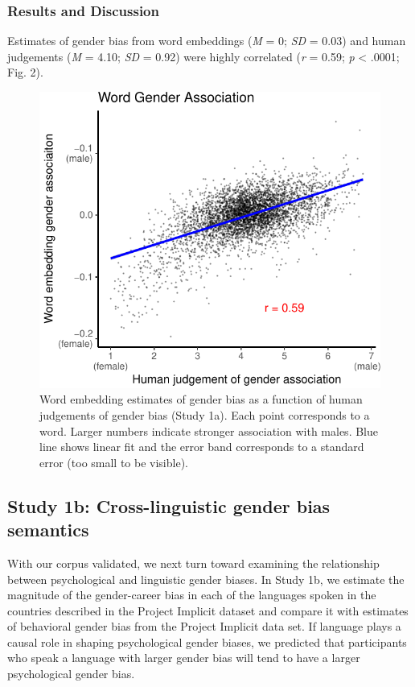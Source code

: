\documentclass[man,floatsintext]{apa6}
\theoremstyle{definition}
\theoremstyle{definition}
\theoremstyle{definition}
\theoremstyle{remark}
\begin{document}
\subsubsection{Results and Discussion}\label{results-and-discussion}

Estimates of gender bias from word embeddings (\emph{M} = 0; \emph{SD} =
0.03) and human judgements (\emph{M} = 4.10; \emph{SD} = 0.92) were
highly correlated (\emph{r} = 0.59; \emph{p} \textless{} .0001; Fig. 2).

\begin{figure}
\centering
\includegraphics{iat_lang_files/figure-latex/unnamed-chunk-10-1.pdf}
\caption{\label{fig:unnamed-chunk-10}Word embedding estimates of gender bias
as a function of human judgements of gender bias (Study 1a). Each point
corresponds to a word. Larger numbers indicate stronger association with
males. Blue line shows linear fit and the error band corresponds to a
standard error (too small to be visible).}
\end{figure}

\subsection{Study 1b: Cross-linguistic gender bias
semantics}\label{study-1b-cross-linguistic-gender-bias-semantics}

With our corpus validated, we next turn toward examining the
relationship between psychological and linguistic gender biases. In
Study 1b, we estimate the magnitude of the gender-career bias in each of
the languages spoken in the countries described in the Project Implicit
dataset and compare it with estimates of behavioral gender bias from the
Project Implicit data set. If language plays a causal role in shaping
psychological gender biases, we predicted that participants who speak a
language with larger gender bias will tend to have a larger
psychological gender bias.
\end{document}
